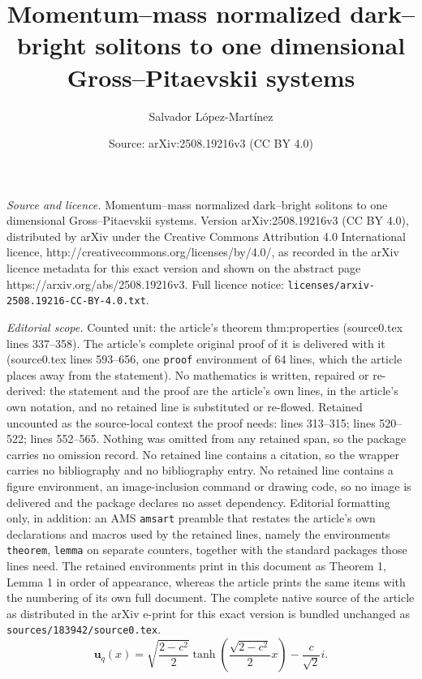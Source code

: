 \documentclass[10pt,a4paper]{amsart}
\title{Momentum--mass normalized dark--bright solitons to one dimensional Gross--Pitaevskii systems}
\author{Salvador L\'opez-Mart\'inez}
\date{Source: arXiv:2508.19216v3 (CC BY 4.0)}
\newcommand{\bu}{\mathbf{u}}
\begin{document}
\maketitle

\noindent\emph{Source and licence.} Momentum--mass normalized dark--bright solitons to one dimensional Gross--Pitaevskii systems. Version arXiv:2508.19216v3 (CC BY 4.0), distributed by arXiv under the Creative Commons Attribution 4.0 International licence, http://creativecommons.org/licenses/by/4.0/, as recorded in the arXiv licence metadata for this exact version and shown on the abstract page https://arxiv.org/abs/2508.19216v3. Full licence notice: \texttt{licenses/arxiv-2508.19216-CC-BY-4.0.txt}.\par\smallskip

\noindent\textit{Editorial scope.} Counted unit: the article's theorem thm:properties (source0.tex lines 337--358). The article's complete original proof of it is delivered with it (source0.tex lines 593--656, one \texttt{proof} environment of 64 lines, which the article places away from the statement). No mathematics is written, repaired or re-derived: the statement and the proof are the article's own lines, in the article's own notation, and no retained line is substituted or re-flowed.  Retained uncounted as the source-local context the proof needs: lines 313--315; lines 520--522; lines 552--565.  Nothing was omitted from any retained span, so the package carries no omission record.  No retained line contains a citation, so the wrapper carries no bibliography and no bibliography entry.  No retained line contains a figure environment, an image-inclusion command or drawing code, so no image is delivered and the package declares no asset dependency.  Editorial formatting only, in addition: an AMS \texttt{amsart} preamble that restates the article's own declarations and macros used by the retained lines, namely the environments \texttt{theorem}, \texttt{lemma} on separate counters, together with the standard packages those lines need.  The retained environments print in this document as Theorem 1, Lemma 1 in order of appearance, whereas the article prints the same items with the numbering of its own full document.  The complete native source of the article as distributed in the arXiv e-print for this exact version is bundled unchanged as \texttt{sources/183942/source0.tex}.
\begin{equation}\label{eq:explicitsol}
    \bu_q(x)=\sqrt{\frac{2-c^2}{{2}}}\tanh\left(\frac{\sqrt{2-c^2}}{2}x\right)-\frac{c}{\sqrt{2}}i.
\end{equation}
\end{document}
